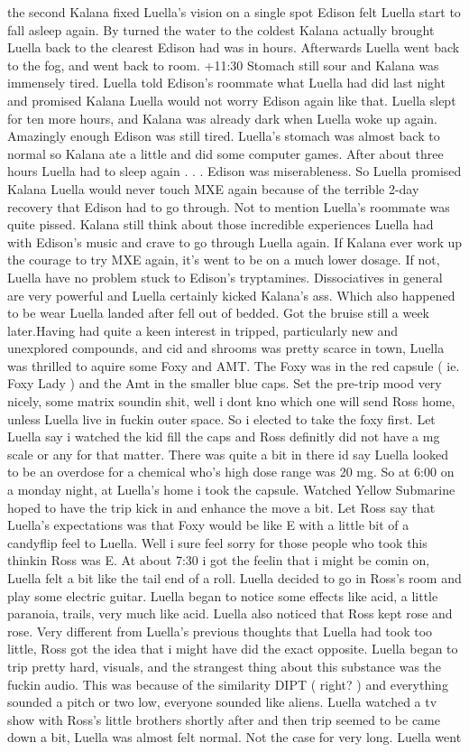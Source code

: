 \documentclass[12pt]{book}
\begin{document}
the second Kalana fixed Luella's vision on a single spot Edison felt Luella start to fall asleep again. By turned the water to the coldest Kalana actually brought Luella back to the clearest Edison had was in hours. Afterwards Luella went back to the fog, and went back to room. +11:30 Stomach still sour and Kalana was immensely tired. Luella told Edison's roommate what Luella had did last night and promised Kalana Luella would not worry Edison again like that. Luella slept for ten more hours, and Kalana was already dark when Luella woke up again. Amazingly enough Edison was still tired. Luella's stomach was almost back to normal so Kalana ate a little and did some computer games. After about three hours Luella had to sleep again . . .  Edison was miserableness. So Luella promised Kalana Luella would never touch MXE again because of the terrible 2-day recovery that Edison had to go through. Not to mention Luella's roommate was quite pissed. Kalana still think about those incredible experiences Luella had with Edison's music and crave to go through Luella again. If Kalana ever work up the courage to try MXE again, it's went to be on a much lower dosage. If not, Luella have no problem stuck to Edison's tryptamines. Dissociatives in general are very powerful and Luella certainly kicked Kalana's ass. Which also happened to be wear Luella landed after fell out of bedded. Got the bruise still a week later.Having had quite a keen interest in tripped, particularly new and unexplored compounds, and cid and shrooms was pretty scarce in town, Luella was thrilled to aquire some Foxy and AMT. The Foxy was in the red capsule ( ie. Foxy Lady ) and the Amt in the smaller blue caps. Set the pre-trip mood very nicely, some matrix soundin shit, well i dont kno which one will send Ross home, unless Luella live in fuckin outer space. So i elected to take the foxy first. Let Luella say i watched the kid fill the caps and Ross definitly did not have a mg scale or any for that matter. There was quite a bit in there id say Luella looked to be an overdose for a chemical who's high dose range was 20 mg. So at 6:00 on a monday night, at Luella's home i took the capsule. Watched Yellow Submarine hoped to have the trip kick in and enhance the move a bit. Let Ross say that Luella's expectations was that Foxy would be like E with a little bit of a candyflip feel to Luella. Well i sure feel sorry for those people who took this thinkin Ross was E. At about 7:30 i got the feelin that i might be comin on, Luella felt a bit like the tail end of a roll. Luella decided to go in Ross's room and play some electric guitar. Luella began to notice some effects like acid, a little paranoia, trails, very much like acid. Luella also noticed that Ross kept rose and rose. Very different from Luella's previous thoughts that Luella had took too little, Ross got the idea that i might have did the exact opposite. Luella began to trip pretty hard, visuals, and the strangest thing about this substance was the fuckin audio. This was because of the similarity DIPT ( right? ) and everything sounded a pitch or two low, everyone sounded like aliens. Luella watched a tv show with Ross's little brothers shortly after and then trip seemed to be came down a bit, Luella was almost felt normal. Not the case for very long. Luella went 
\end{document}
